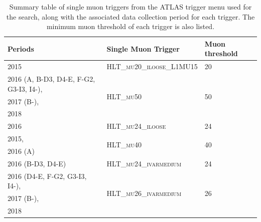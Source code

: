 \begin{table}[ht]
\caption{Summary table of single muon triggers from the ATLAS trigger menu used for the search, along with the associated data collection period for each trigger. The minimum muon \pt threshold of each trigger is also listed.}
\label{tab:summary_muon_triggers_used}
\footnotesize{
	\begin{center}
	\begin{tabular}{l l l }
		\toprule
			Periods & Single Muon Trigger & Muon \pt threshold \\
			\midrule
			\midrule
			2015 & \textsc{HLT\_mu20\_iloose\_L1MU15} & 20 \GeV \\
			\midrule
			2016 (A, B-D3, D4-E, F-G2, G3-I3, I4-), & \multirow{3}{*}{\textsc{HLT\_mu50}} & \multirow{3}{*}{50 \GeV} \\
			2017 (B-), & & \\
			2018 & & \\
			\midrule
			2016 & \textsc{HLT\_mu24\_iloose} & 24 \GeV \\
			\midrule
			2015, & \multirow{2}{*}{\textsc{HLT\_mu40}} & \multirow{2}{*}{40 \GeV} \\
			2016 (A) & & \\
			\midrule
			2016 (B-D3, D4-E) & \textsc{HLT\_mu24\_ivarmedium} & 24 \GeV \\
			\midrule
			2016 (D4-E, F-G2, G3-I3, I4-),  & \multirow{3}{*}{\textsc{HLT\_mu26\_ivarmedium}} & \multirow{3}{*}{26 \GeV} \\
			2017 (B-), \\
			2018 \\
		\bottomrule
	\end{tabular}
	\end{center}
	}
\end{table}

